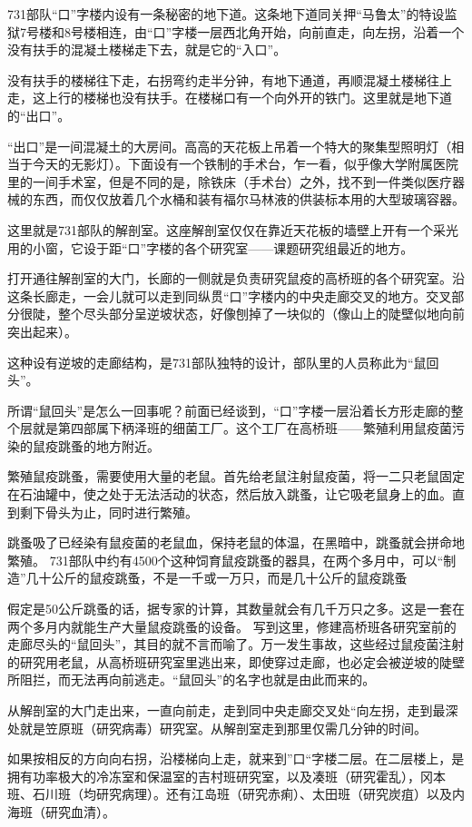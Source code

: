 \documentclass[a4paper,12pt,UTF8,twoside]{ctexbook}
\begin{document}
731部队“口”字楼内设有一条秘密的地下道。这条地下道同关押“马鲁太”的特设监狱7号楼和8号楼相连，由“口”字楼一层西北角开始，向前直走，向左拐，沿着一个没有扶手的混凝土楼梯走下去，就是它的“入口”。

没有扶手的楼梯往下走，右拐弯约走半分钟，有地下通道，再顺混凝土楼梯往上走，这上行的楼梯也没有扶手。在楼梯口有一个向外开的铁门。这里就是地下道的“出口”。

“出口”是一间混凝土的大房间。高高的天花板上吊着一个特大的聚集型照明灯（相当于今天的无影灯）。下面设有一个铁制的手术台，乍一看，似乎像大学附属医院里的一间手术室，但是不同的是，除铁床（手术台）之外，找不到一件类似医疗器械的东西，而仅仅放着几个水桶和装有福尔马林液的供装标本用的大型玻璃容器。

这里就是731部队的解剖室。这座解剖室仅仅在靠近天花板的墙壁上开有一个采光用的小窗，它设于距“口”字楼的各个研究室——课题研究组最近的地方。

打开通往解剖室的大门，长廊的一侧就是负责研究鼠疫的高桥班的各个研究室。沿这条长廊走，一会儿就可以走到同纵贯“口”字楼内的中央走廊交叉的地方。交叉部分很陡，整个尽头部分呈逆坡状态，好像刨掉了一块似的（像山上的陡壁似地向前突出起来）。

这种设有逆坡的走廊结构，是731部队独特的设计，部队里的人员称此为“鼠回头”。

所谓“鼠回头”是怎么一回事呢？前面已经谈到，“口”字楼一层沿着长方形走廊的整个层就是第四部属下柄泽班的细菌工厂。这个工厂在高桥班——繁殖利用鼠疫菌污染的鼠疫跳蚤的地方附近。

繁殖鼠疫跳蚤，需要使用大量的老鼠。首先给老鼠注射鼠疫菌，将一二只老鼠固定在石油罐中，使之处于无法活动的状态，然后放入跳蚤，让它吸老鼠身上的血。直到剩下骨头为止，同时进行繁殖。

跳蚤吸了已经染有鼠疫菌的老鼠血，保持老鼠的体温，在黑暗中，跳蚤就会拼命地繁殖。
731部队中约有4500个这种饲育鼠疫跳蚤的器具，在两个多月中，可以“制造”几十公斤的鼠疫跳蚤，不是一千或一万只，而是几十公斤的鼠疫跳蚤

假定是50公斤跳蚤的话，据专家的计算，其数量就会有几千万只之多。这是一套在两个多月内就能生产大量鼠疫跳蚤的设备。
写到这里，修建高桥班各研究室前的走廊尽头的“鼠回头”，其目的就不言而喻了。万一发生事故，这些经过鼠疫菌注射的研究用老鼠，从高桥班研究室里逃出来，即使穿过走廊，也必定会被逆坡的陡壁所阻拦，而无法再向前逃走。“鼠回头”的名字也就是由此而来的。

从解剖室的大门走出来，一直向前走，走到同中央走廊交叉处“向左拐，走到最深处就是笠原班（研究病毒）研究室。从解剖室走到那里仅需几分钟的时间。

如果按相反的方向向右拐，沿楼梯向上走，就来到”口“字楼二层。在二层楼上，是拥有功率极大的冷冻室和保温室的吉村班研究室，以及凑班（研究霍乱），冈本班、石川班（均研究病理）。还有江岛班（研究赤痢）、太田班（研究炭疽）以及内海班（研究血清）。
\end{document}
